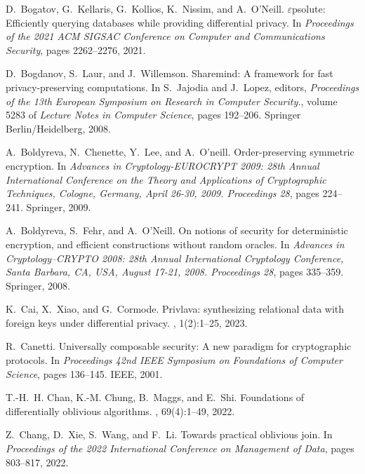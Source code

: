\documentclass[11pt]{article}
\begin{document}
\begin{thebibliography}{140}
\begin{small}
D.~Bogatov, G.~Kellaris, G.~Kollios, K.~Nissim, and A.~O'Neill.
\newblock \ensuremath{\varepsilon}psolute: Efficiently querying databases while
  providing differential privacy.
\newblock In {\em Proceedings of the 2021 ACM SIGSAC Conference on Computer and
  Communications Security}, pages 2262--2276, 2021.

D.~Bogdanov, S.~Laur, and J.~Willemson.
\newblock Sharemind: A framework for fast privacy-preserving computations.
\newblock In S.~Jajodia and J.~Lopez, editors, {\em Proceedings of the 13th
  European Symposium on Research in Computer Security.}, volume 5283 of {\em
  Lecture Notes in Computer Science}, pages 192--206. Springer
  Berlin/Heidelberg, 2008.

A.~Boldyreva, N.~Chenette, Y.~Lee, and A.~O’neill.
\newblock Order-preserving symmetric encryption.
\newblock In {\em Advances in Cryptology-EUROCRYPT 2009: 28th Annual
  International Conference on the Theory and Applications of Cryptographic
  Techniques, Cologne, Germany, April 26-30, 2009. Proceedings 28}, pages
  224--241. Springer, 2009.

A.~Boldyreva, S.~Fehr, and A.~O’Neill.
\newblock On notions of security for deterministic encryption, and efficient
  constructions without random oracles.
\newblock In {\em Advances in Cryptology--CRYPTO 2008: 28th Annual
  International Cryptology Conference, Santa Barbara, CA, USA, August 17-21,
  2008. Proceedings 28}, pages 335--359. Springer, 2008.

K.~Cai, X.~Xiao, and G.~Cormode.
\newblock Privlava: synthesizing relational data with foreign keys under
  differential privacy.
, 1(2):1--25, 2023.

R.~Canetti.
\newblock Universally composable security: A new paradigm for cryptographic
  protocols.
\newblock In {\em Proceedings 42nd IEEE Symposium on Foundations of Computer
  Science}, pages 136--145. IEEE, 2001.

T.-H.~H. Chan, K.-M. Chung, B.~Maggs, and E.~Shi.
\newblock Foundations of differentially oblivious algorithms.
, 69(4):1--49, 2022.

Z.~Chang, D.~Xie, S.~Wang, and F.~Li.
\newblock Towards practical oblivious join.
\newblock In {\em Proceedings of the 2022 International Conference on
  Management of Data}, pages 803--817, 2022.


\end{small}
\end{thebibliography}
\end{document}
